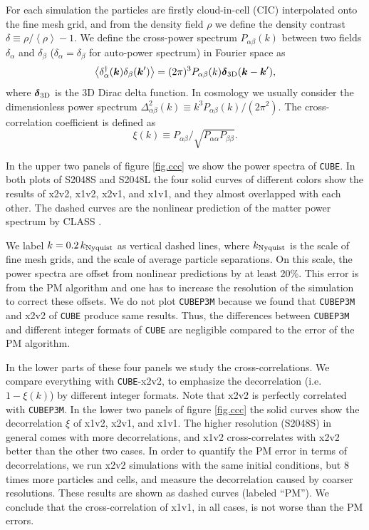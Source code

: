 \documentclass[10pt,twocolumn,reprint]{emulateapj}
\newcommand{\bs}{\boldsymbol}
\begin{document}
For each simulation the particles are firstly cloud-in-cell (CIC) interpolated onto the fine mesh grid, and from the density field $\rho$ we define the density contrast $\delta\equiv \rho/\left\langle \rho \right\rangle-1$. We define the cross-power spectrum $P_{\alpha\beta}(k)$ between two fields $\delta_\alpha$ and $\delta_\beta$ ($\delta_\alpha=\delta_\beta$ for auto-power spectrum) in Fourier space as
\begin{equation}\label{eq.cps}
	\left\langle \delta_\alpha^\dagger({\bs k})\delta_\beta({\bs k}') \right\rangle=
    (2\pi)^3 P_{\alpha\beta}(k){\bs \delta}_{\rm 3D}({\bs k}-{\bs k}'),
\end{equation}
where ${\bs \delta}_{\rm 3D}$ is the 3D Dirac delta function. In cosmology we usually consider the dimensionless power spectrum $\Delta^2_{\alpha\beta}(k)\equiv k^3 P_{\alpha\beta}(k)/(2\pi^2)$. The cross-correlation coefficient is defined as
\begin{equation}\label{eq.ccc}
	\xi(k)\equiv P_{\alpha\beta}/\sqrt{P_{\alpha\alpha}P_{\beta\beta}}.
\end{equation}

In the upper two panels of figure \ref{fig.ccc} we show the power spectra of {\tt CUBE}. In both plots of S2048S and S2048L the four solid curves of different colors show the results of x2v2, x1v2, x2v1, and x1v1, and they almost overlapped with each other. The dashed curves are the nonlinear prediction of the matter power spectrum by CLASS \citep{2011JCAP...07..034B}.

We label $k=0.2\,k_{\rm Nyquist}$ as vertical dashed lines, where $k_{\rm Nyquist}$ is the scale of fine mesh grids, and the scale of average particle separations. On this scale, the power spectra are offset from nonlinear predictions by at least 20\%. This error is from the PM algorithm and one has to increase the resolution of the simulation to correct these offsets. We do not plot {\tt CUBEP3M} because we found that {\tt CUBEP3M} and x2v2 of {\tt CUBE} produce same results. Thus, the differences between {\tt CUBEP3M} and different integer formats of {\tt CUBE} are negligible compared to the error of the PM algorithm.

In the lower parts of these four panels we study the cross-correlations. We compare everything with {\tt CUBE}-x2v2, to emphasize the decorrelation (i.e. $1-\xi(k)$) by different integer formats. Note that x2v2 is perfectly correlated with {\tt CUBEP3M}. In the lower two panels of figure \ref{fig.ccc} the solid curves show the decorrelation $\xi$ of x1v2, x2v1, and x1v1. The higher resolution (S2048S) in general comes with more decorrelations, and x1v2 cross-correlates with x2v2 better than the other two cases. In order to quantify the PM error in terms of decorrelations, we run x2v2 simulations with the same initial conditions, but 8 times more particles and cells, and measure the decorrelation caused by coarser resolutions. These results are shown as dashed curves (labeled ``PM''). We conclude that the cross-correlation of x1v1, in all cases, is not worse than the PM errors.
\end{document}
